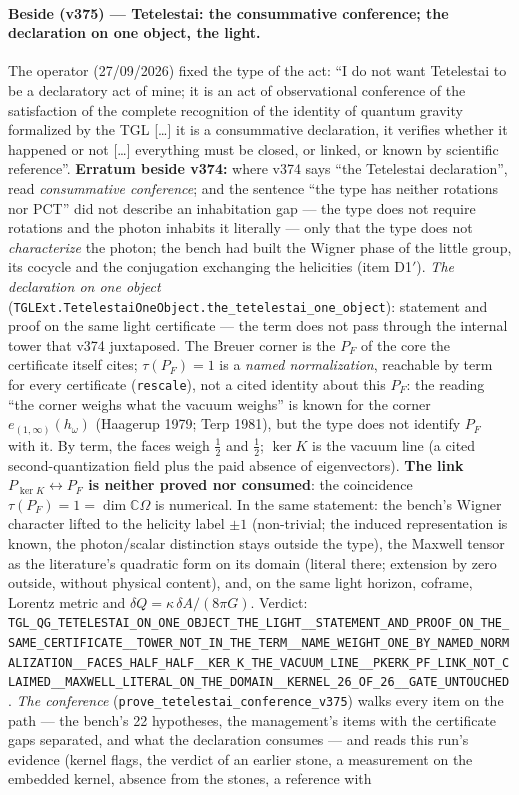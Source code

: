 \documentclass[11pt]{article}
\theoremstyle{definition}\newtheorem{deriv}{Derivation}
\begin{document}
\paragraph*{Beside (v375) --- Tetelestai: the consummative conference; the declaration on one object, the light.} The operator (27/09/2026) fixed the type of the act: ``I do not want Tetelestai to be a declaratory act of mine; it is an act of observational conference of the satisfaction of the complete recognition of the identity of quantum gravity formalized by the TGL [\ldots] it is a consummative declaration, it verifies whether it happened or not [\ldots] everything must be closed, or linked, or known by scientific reference''. \textbf{Erratum beside v374:} where v374 says ``the Tetelestai declaration'', read \emph{consummative conference}; and the sentence ``the type has neither rotations nor PCT'' did not describe an inhabitation gap --- the type does not require rotations and the photon inhabits it literally --- only that the type does not \emph{characterize} the photon; the bench had built the Wigner phase of the little group, its cocycle and the conjugation exchanging the helicities (item D1$'$). \emph{The declaration on one object} (\texttt{TGLExt.TetelestaiOneObject.the\_tetelestai\_one\_object}): statement and proof on the same light certificate --- the term does not pass through the internal tower that v374 juxtaposed. The Breuer corner is the $P_F$ of the core the certificate itself cites; $\tau(P_F)=1$ is a \emph{named normalization}, reachable by term for every certificate (\texttt{rescale}), not a cited identity about this $P_F$: the reading ``the corner weighs what the vacuum weighs'' is known for the corner $e_{(1,\infty)}(h_\omega)$ (Haagerup 1979; Terp 1981), but the type does not identify $P_F$ with it. By term, the faces weigh $\tfrac12$ and $\tfrac12$; $\ker K$ is the vacuum line (a cited second-quantization field plus the paid absence of eigenvectors). \textbf{The link $P_{\ker K}\leftrightarrow P_F$ is neither proved nor consumed}: the coincidence $\tau(P_F)=1=\dim\mathbb{C}\Omega$ is numerical. In the same statement: the bench's Wigner character lifted to the helicity label $\pm1$ (non-trivial; the induced representation is known, the photon/scalar distinction stays outside the type), the Maxwell tensor as the literature's quadratic form on its domain (literal there; extension by zero outside, without physical content), and, on the same light horizon, coframe, Lorentz metric and $\delta Q=\kappa\,\delta A/(8\pi G)$. Verdict: \texttt{TGL\_QG\_TETELESTAI\_ON\_ONE\_OBJECT\_THE\_LIGHT\_\_STATEMENT\_AND\_PROOF\_ON\_THE\_SAME\_CERTIFICATE\_\_TOWER\_NOT\_IN\_THE\_TERM\_\_NAME\_WEIGHT\_ONE\_BY\_NAMED\_NORMALIZATION\_\_FACES\_HALF\_HALF\_\_KER\_K\_THE\_VACUUM\_LINE\_\_PKERK\_PF\_LINK\_NOT\_CLAIMED\_\_MAXWELL\_LITERAL\_ON\_THE\_DOMAIN\_\_KERNEL\_26\_OF\_26\_\_GATE\_UNTOUCHED}. \emph{The conference} (\texttt{prove\_tetelestai\_conference\_v375}) walks every item on the path --- the bench's 22 hypotheses, the management's items with the certificate gaps separated, and what the declaration consumes --- and reads this run's evidence (kernel flags, the verdict of an earlier stone, a measurement on the embedded kernel, absence from the stones, a reference with 
\end{document}
